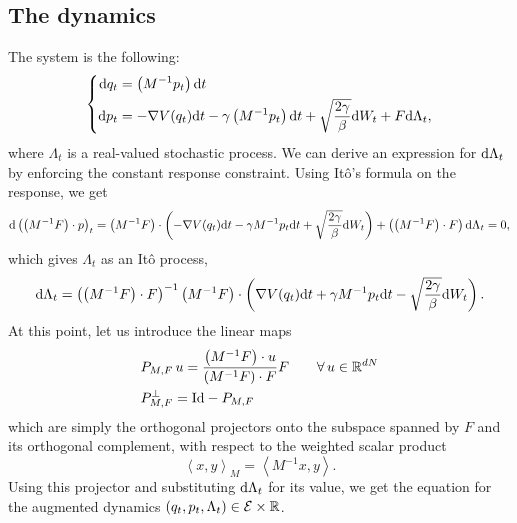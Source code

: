 \subsection{The dynamics}
The system is the following:
\begin{equation}
    \label{eq:norton_method}
    \left\{\begin{aligned}
        \mathrm{d} q_t&=\left(M^{-1}p_t\right)\mathrm{d} t\\
        \mathrm{d} p_t&=-\nabla V(q_t)\mathrm{d} t -\gamma\left(M^{-1}p_t\right)\mathrm{d} t+\sqrt{\frac{2\gamma}\beta}\mathrm{d} W_t+F\mathrm{d} \Lambda_t,
    \end{aligned}\right.
\end{equation}
where $\Lambda_t$ is a real-valued stochastic process. We can derive an expression for $\mathrm{d} \Lambda_t$ by enforcing the constant response constraint.
Using Itô's formula on the response, we get
\begin{equation}
    \label{eq:formula_response}
\mathrm{d} \left(\left(M^{-1}F\right)\cdot p\right)_t=\left(M^{-1}F\right)\cdot\left(-\nabla V(q_t)\mathrm{d} t -\gamma M^{-1}p_t\mathrm{d} t+\sqrt{\frac{2\gamma}\beta}\mathrm{d} W_t\right)+\left( \left(M^{-1}F\right)\cdot F\right)\mathrm{d}\Lambda_t=0,
\end{equation}
which gives $\Lambda_t$ as an Itô process,
\begin{equation}
    \label{eq:norton_multiplier_ito_decomposition}
    \mathrm{d} \Lambda_t=\left( \left(M^{-1}F\right)\cdot F\right)^{-1}\left(M^{-1}F\right)\cdot\left(\nabla V(q_t)\mathrm{d} t +\gamma M^{-1}p_t\mathrm{d} t-\sqrt{\frac{2\gamma}\beta}\mathrm{d} W_t\right).
\end{equation}
At this point, let us introduce the linear maps
\begin{equation}
    \label{eq:norton_projector}
    \begin{aligned}
        &P_{M,F}\,u=\frac{\left(M^{-1}F\right)\cdot u}{\left(M^{-1}F\right)\cdot F}F\qquad\forall\,u\in\mathbb{R}^{dN}\\
        &P_{M,F}^\perp=\mathrm{Id}-P_{M,F}
    \end{aligned}
\end{equation}
which are simply the orthogonal projectors onto the subspace spanned by $F$ and its orthogonal complement, with respect to the weighted scalar product
\begin{equation}
    \label{eq:norton_weighted_scalar_product}
    \left\langle x,y\right\rangle_{M}=\left\langle M^{-1}x,y\right\rangle.
\end{equation}
Using this projector and substituting $\mathrm{d} \Lambda_t$ for its value, we get the equation for the augmented dynamics $(q_t,p_t,\Lambda_t)\in \mathcal E\times \mathbb{R}$.
